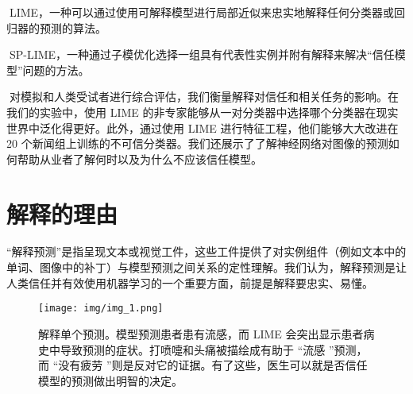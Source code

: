 \documentclass[12pt, a4paper]{ctexart} %
\begin{document}
LIME，一种可以通过使用可解释模型进行局部近似来忠实地解释任何分类器或回归器的预测的算法。

SP-LIME，一种通过子模优化选择一组具有代表性实例并附有解释来解决“信任模型”问题的方法。

对模拟和人类受试者进行综合评估，我们衡量解释对信任和相关任务的影响。在我们的实验中，使用 LIME 的非专家能够从一对分类器中选择哪个分类器在现实世界中泛化得更好。此外，通过使用 LIME 进行特征工程，他们能够大大改进在 20 个新闻组上训练的不可信分类器。我们还展示了了解神经网络对图像的预测如何帮助从业者了解何时以及为什么不应该信任模型。

\section{解释的理由}
“解释预测”是指呈现文本或视觉工件，这些工件提供了对实例组件（例如文本中的单词、图像中的补丁）与模型预测之间关系的定性理解。我们认为，解释预测是让人类信任并有效使用机器学习的一个重要方面，前提是解释要忠实、易懂。

\begin{figure}[h]
    \centering
    \texttt{[image: img/img\_1.png]}
    \caption{解释单个预测。模型预测患者患有流感，而 LIME 会突出显示患者病史中导致预测的症状。打喷嚏和头痛被描绘成有助于 “流感 ”预测，而 “没有疲劳 ”则是反对它的证据。有了这些，医生可以就是否信任模型的预测做出明智的决定。}
    \label{fig:img_1}
\end{figure}
\end{document}
